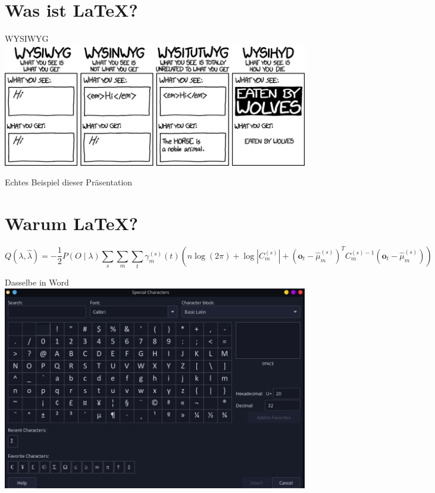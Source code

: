 \documentclass{beamer}
\begin{document}
  \section{Was ist \LaTeX?}
  \begin{frame}{WYSIWYG}
    \includegraphics[width=\textwidth]{types_of_editors_2x.png}
  \end{frame}
  \begin{frame}{Echtes Beispiel dieser Präsentation}
  \end{frame}
  \section{Warum \LaTeX?}
  \begin{frame}
\begin{dmath}
  Q(\lambda,\hat{\lambda}) = -\frac{1}{2} P{(O \mid \lambda )} \sum_s \sum_m \sum_t \gamma_m^{(s)} (t) \left( n \log(2 \pi ) + \log \left| C_m^{(s)} \right| + \left( \mathbf{o}_t - \hat{\mu}_m^{(s)} \right) ^T C_m^{(s)-1} \left(\mathbf{o}_t - \hat{\mu}_m^{(s)}\right) \right)
\end{dmath}
\end{frame}
\begin{frame}{Dasselbe in Word}
\href{https://i.makeagif.com/media/5-28-2022/dXcfrH.gif}{\includegraphics[width=\textwidth]{FormelnWord.png}}
\end{frame}
\end{document}
